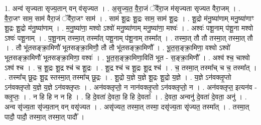 \documentclass[17pt]{extarticle}
\begin{document}
1. अन्व॑ सृज्यता सृज्य॒तान् वन् व॑सृज्यत । . अ॒सृ॒ज्य॒त॒ वै॒रा॒जं ॅवै॑रा॒ज म॑सृज्यता सृज्यत वैरा॒जम् । . वै॒रा॒जꣳ साम॒ साम॑ वैरा॒जं ॅवै॑रा॒जꣳ साम॑ । . साम॑ शू॒द्रः शू॒द्रः साम॒ साम॑ शू॒द्रः । . शू॒द्रो म॑नु॒ष्या॑णाम् मनु॒ष्या॑णाꣳ शू॒द्रः शू॒द्रो म॑नु॒ष्या॑णाम् । . म॒नु॒ष्या॑णा॒ मश्वो ऽश्वो॑ मनु॒ष्या॑णाम् मनु॒ष्या॑णा॒ मश्वः॑ । . अश्वः॑ पशू॒नाम् प॑शू॒ना मश्वो ऽश्वः॑ पशू॒नाम् । . प॒शू॒नाम् तस्मा॒त् तस्मा᳚त् पशू॒नाम् प॑शू॒नाम् तस्मा᳚त् । . तस्मा॒त् तौ तौ तस्मा॒त् तस्मा॒त् तौ । . तौ भू॑तसङ्क्रा॒मिणौ॑ भूतसङ्क्रा॒मिणौ॒ तौ तौ भू॑तसङ्क्रा॒मिणौ᳚ । . भू॒त॒स॒ङ्क्रा॒मिणा॒ वश्वो ऽश्वो॑ भूतसङ्क्रा॒मिणौ॑ भूतसङ्क्रा॒मिणा॒ वश्वः॑ । . भू॒त॒स॒ङ्क्रा॒मिणा॒विति॑ भूत - स॒ङ्क्रा॒मिणौ᳚ । . अश्व॑ श्च॒ चाश्वो ऽश्व॑ श्च । . च॒ शू॒द्रः शू॒द्र श्च॑ च शू॒द्रः । . शू॒द्र श्च॑ च शू॒द्रः शू॒द्र श्च॑ । . च॒ तस्मा॒त् तस्मा᳚च् च च॒ तस्मा᳚त् । . तस्मा᳚च् छू॒द्रः शू॒द्र स्तस्मा॒त् तस्मा᳚च् छू॒द्रः । . शू॒द्रो य॒ज्ञे य॒ज्ञे शू॒द्रः शू॒द्रो य॒ज्ञे । . य॒ज्ञे ऽन॑वक्लृ॒प्तो ऽन॑वक्लृप्तो य॒ज्ञे य॒ज्ञे ऽन॑वक्लृप्तः । . अन॑वक्लृप्तो॒ न नान॑वक्लृ॒प्तो ऽन॑वक्लृप्तो॒ न । . अन॑वक्लृप्त॒ इत्यन॑व - क्लृ॒प्तः॒ । . न हि हि न न हि । . हि दे॒वता॑ दे॒वता॒ हि हि दे॒वताः᳚ । . दे॒वता॒ अन्वनु॑ दे॒वता॑ दे॒वता॒ अनु॑ । . अन्व सृ॑ज्य॒ता सृ॑ज्य॒तान् वन् वसृ॑ज्यत । . असृ॑ज्यत॒ तस्मा॒त् तस्मा॒ दसृ॑ज्य॒ता सृ॑ज्यत॒ तस्मा᳚त् । . तस्मा॒त् पादौ॒ पादौ॒ तस्मा॒त् तस्मा॒त् पादौ᳚ । \newline
\end{document}

